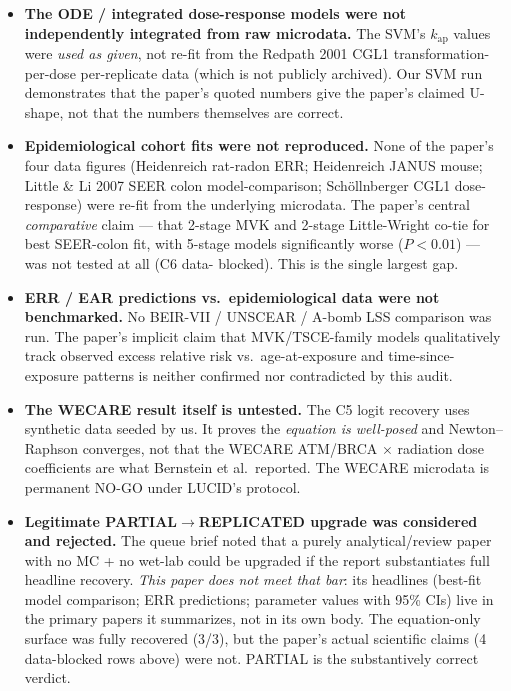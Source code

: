 \documentclass[11pt]{article}
\begin{document}
\begin{itemize}
\item \textbf{The ODE / integrated dose-response models were not
      independently integrated from raw microdata.} The SVM's
      $k_{\mathrm{ap}}$ values were \emph{used as given}, not re-fit from
      the Redpath 2001 CGL1 transformation-per-dose per-replicate data
      (which is not publicly archived). Our SVM run demonstrates that
      the paper's quoted numbers give the paper's claimed U-shape, not
      that the numbers themselves are correct.
\item \textbf{Epidemiological cohort fits were not reproduced.} None of
      the paper's four data figures (Heidenreich rat-radon ERR;
      Heidenreich JANUS mouse; Little \& Li 2007 SEER colon
      model-comparison; Sch\"ollnberger CGL1 dose-response) were re-fit
      from the underlying microdata. The paper's central
      \emph{comparative} claim --- that 2-stage MVK and 2-stage
      Little-Wright co-tie for best SEER-colon fit, with 5-stage models
      significantly worse ($P<0.01$) --- was not tested at all (C6 data-
      blocked). This is the single largest gap.
\item \textbf{ERR / EAR predictions vs.\ epidemiological data were not
      benchmarked.} No BEIR-VII / UNSCEAR / A-bomb LSS comparison was
      run. The paper's implicit claim that MVK/TSCE-family models
      qualitatively track observed excess relative risk vs.\ age-at-exposure
      and time-since-exposure patterns is neither confirmed nor
      contradicted by this audit.
\item \textbf{The WECARE result itself is untested.} The C5 logit
      recovery uses synthetic data seeded by us. It proves the
      \emph{equation is well-posed} and Newton--Raphson converges,
      not that the WECARE ATM/BRCA $\times$ radiation dose coefficients
      are what Bernstein et al.\ reported. The WECARE microdata is
      permanent NO-GO under LUCID's protocol.
\item \textbf{Legitimate PARTIAL$\to$REPLICATED upgrade was considered
      and rejected.} The queue brief noted that a purely
      analytical/review paper with no MC + no wet-lab could be
      upgraded if the report substantiates full headline recovery.
      \emph{This paper does not meet that bar}: its headlines
      (best-fit model comparison; ERR predictions; parameter values
      with 95\% CIs) live in the primary papers it summarizes, not
      in its own body. The equation-only surface was fully recovered
      (3/3), but the paper's actual scientific claims (4 data-blocked
      rows above) were not. PARTIAL is the substantively correct
      verdict.
\end{itemize}
\end{document}
